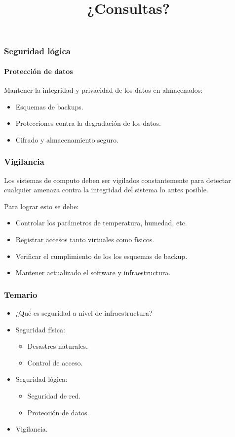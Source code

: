 \documentclass[11pt,a4paper,spanish]{beamer}
\begin{document}
\begin{frame}
    \frametitle{Seguridad lógica}
    \framesubtitle{Protección de datos}
    
    Mantener la integridad y privacidad de los datos en almacenados:
        \begin{itemize}
            \item Esquemas de backups.
            \item Protecciones contra la degradación de los datos.
            \item Cifrado y almacenamiento seguro.
        \end{itemize}
\end{frame}

\begin{frame}
    \frametitle{Vigilancia}

    Los sistemas de computo deben ser vigilados constantemente para detectar
    cualquier amenaza contra la integridad del sistema lo antes posible.

    Para lograr esto se debe:
    \begin{itemize}
        \item Controlar los parámetros de temperatura, humedad, etc.
        \item Registrar accesos tanto virtuales como físicos.
        \item Verificar el cumplimiento de los los esquemas de backup.
        \item Mantener actualizado el software y infraestructura.
    \end{itemize}
    
\end{frame}

\begin{frame}

    \frametitle{Temario}

\begin{itemize}

    \item ¿Qué es seguridad a nivel de infraestructura?
    \item Seguridad física: 
    \begin{itemize}
        \item Desastres naturales.
        \item Control de acceso.
    \end{itemize}
    \item Seguridad lógica:
    \begin{itemize}
        \item Seguridad de red.
        \item Protección de datos.
    \end{itemize}
    \item Vigilancia.

\end{itemize}
\end{frame}

\begin{frame}

\title{¿Consultas?}
\maketitle

\end{frame}

\setcounter{lastPage}{\number\value{page}}

\setcounter{page}{\number\value{lastPage}}
\end{document}
